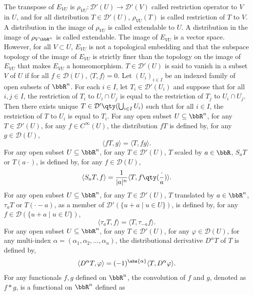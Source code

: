 \documentclass[a4paper,12pt]{report}
\begin{document}
The transpose of $E_{VU}$ is $\rho_{VU}\colon\mathcal{D}'(U)\to\mathcal{D}'(V)$ called restriction operator to $V$ in $U$, and for all distribution $T\in\mathcal{D}'(U)$, $\rho_{VU}(T)$ is called restriction of $T$ to $V$. A distribution in the image of $\rho_{VU}$ is called extendable to $U$. A distribution in the image of $\rho_{V\bbR^n}$ is called extendable.
The image of $E_{VU}$ is a vector space. However, for all $V\subset U$, $E_{VU}$ is not a topological embedding and that the subspace topology of the image of $E_{VU}$ is strictly finer than the topology on the image of $E_{VU}$ that makes $E_{VU}$ a homeomorphism.
$T\in\mathcal{D}'(U)$ is said to vanish in a subset $V$ of $U$ if for all $f\in\mathcal{D}(U)$, $\langle T,f\rangle=0$.
Let $(U_i)_{i\in I}$ be an indexed family of open subsets of $\bbR^n$. For each $i\in I$, let $T_i\in\mathcal{D}'(U_i)$ and suppose that for all $i,j\in I$, the restriction of $T_i$ to $U_i\cap U_j$ is equal to the restriction of $T_j$ to $U_i\cap U_j$. Then there exists unique $T\in\mathcal{D}'\qty(\bigcup_{i\in I}U_i)$ such that for all $i\in I$, the restriction of $T$ to $U_i$ is equal to $T_i$.
For any open subset $U\subseteq\bbR^n$, for any $T\in\mathcal{D}'(U)$, for any $f\in C^{\infty}(U)$, the distribution $fT$ is defined by, for any $g\in\mathcal{D}(U)$,
\[\langle fT,g\rangle=\langle T,fg\rangle.\]
For any open subset $U\subseteq\bbR^n$, for any $T\in\mathcal{D}'(U)$, $T$ scaled by $a\in\bbR$, $S_aT$ or $T(a\cdot)$, is defined by, for any $f\in\mathcal{D}(U)$,
\[\langle S_aT,f\rangle=\frac{1}{|a|^n}\langle T,f\qty(\frac{\cdot}{a})\rangle.\]
For any open subset $U\subseteq\bbR^n$, for any $T\in\mathcal{D}'(U)$, $T$ translated by $a\in\bbR^n$, $\tau_aT$ or $T(\cdot-a)$, as a member of $\mathcal{D}'(\{u+a\mid u\in U\})$, is defined by, for any $f\in\mathcal{D}(\{u+a\mid u\in U\})$,
\[\langle\tau_aT,f\rangle=\langle T,\tau_{-a}f\rangle.\]
For any open subset $U\subseteq\bbR^n$, for any $T\in\mathcal{D}'(U)$, for any $\varphi\in\mathcal{D}(U)$, for any multi-index $\alpha=(\alpha_1,\alpha_2,\ldots,\alpha_n)$, the distributional derivative $D^{\alpha}T$ of $T$ is defined by,
\[\langle D^{\alpha}T,\varphi\rangle=(-1)^{\abs{\alpha}}\langle T,D^{\alpha}\varphi\rangle.\]
For any functionals $f,g$ defined on $\bbR^n$, the convolution of $f$ and $g$, denoted as $f*g$, is a functional on $\bbR^n$ defined as
\end{document}
